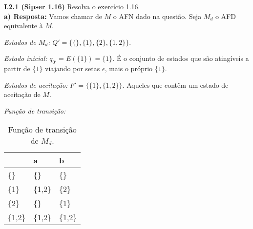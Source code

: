 
\noindent \textbf{L2.1 (Sipser 1.16)} Resolva o exercício 1.16.\\[6pt]
\noindent\textbf{a) Resposta:} Vamos chamar de $M$ o AFN dado na questão. Seja $M_d$ o AFD equivalente à $M$.

\noindent\textit{Estados de $M_d$:} $Q' = \{\{\}, \{1\}, \{2\}, \{1,2\} \}$.

\noindent\textit{Estado inicial:} $q_{0'} = E(\{1\}) = \{1\}$. É o conjunto de estados que são atingíveis a partir de $\{1\}$ viajando por setas $\epsilon$, mais o próprio $\{1\}$.

\noindent\textit{Estados de aceitação:} $F' = \{\{1\}, \{1,2\}\}$. Aqueles que contêm um estado de aceitação de $M$.

\noindent\textit{Função de transição:}
\begin{table}[!h]
\centering
{}
\begin{tabular}{|l|l|l|} \hline
         & a         & b        \\ \hline
\{\}     & \{\}      & \{\}     \\
\{1\}    & \{1,2\}   & \{2\}    \\
\{2\}    & \{\}      & \{1\}    \\
\{1,2\}  & \{1,2\}   & \{1,2\}  \\ \hline
\end{tabular}
\caption{Função de transição de $M_d$.}\vspace*{0.2cm}
\label{tbl:sip1.16a}
\end{table}

